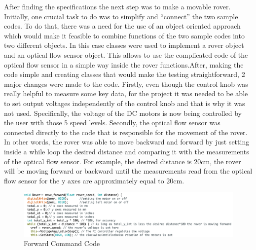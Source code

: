 \documentclass[a4paper]{article}
\begin{document}
After finding the specifications the next step was to make a movable rover. 
Initially, one crucial task to do was to simplify and ``connect''  the two 
sample codes. To do that, there was a need for the use of an object oriented 
approach which would make it feasible to combine functions of the two sample 
codes into two different objects. In this case classes were used to implement 
a rover object and an optical flow sensor object. This allows to use the 
complicated code of the optical flow sensor in a simple way inside the rover 
functions.After, making the code simple and creating classes that would make 
the testing straightforward, 2 major changes were made to the code. Firstly, 
even though the control knob was really helpful to measure some key data, 
for the project it was needed to be able to set output voltages independently 
of the control knob and that is why it was not used. Specifically, the voltage 
of the DC motors is now being controlled by the user with those 5 speed levels. 
Secondly, the optical flow sensor was connected directly to the code that is 
responsible for the movement of the rover. In other words, the rover was able 
to move backward and forward by just setting inside a while loop the desired 
distance and comparing it with the measurements of the optical flow sensor. 
For example, the desired distance is 20cm, the rover will be moving forward 
or backward until the measurements read from the optical flow sensor for the 
y axes are approximately equal to 20cm.

\begin{figure}[H]
	\begin{Center}
		\includegraphics[scale=0.3]{./media/forward.png}
		\caption{Forward Command Code}
	\end{Center}
\end{figure}
\end{document}
